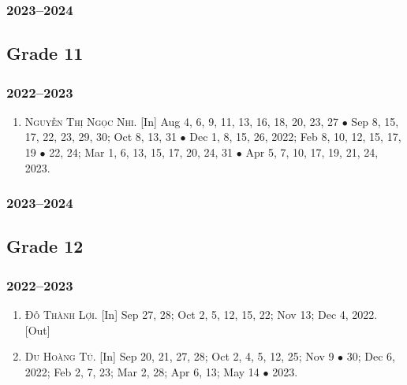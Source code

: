 \documentclass{article}
\begin{document}
\subsubsection{2023--2024}


\subsection{Grade 11}

\subsubsection{2022--2023}

\begin{enumerate}
	\item \textsc{Nguyễn Thị Ngọc Nhi.} \textsf{[In]} Aug 4, 6, 9, 11, 13, 16, 18, 20, 23, 27 $\bullet$ Sep 8, 15, 17, 22, 23, 29, 30; Oct 8, 13, 31 $\bullet$ Dec 1, 8,  15, 26, 2022; Feb 8, 10, 12, 15, 17, 19 $\bullet$ 22, 24; Mar 1, 6, 13, 15, 17, 20, 24, 31 $\bullet$ Apr 5, 7, 10, 17, 19, 21, 24, 2023.
\end{enumerate}

\subsubsection{2023--2024}


\subsection{Grade 12}

\subsubsection{2022--2023}

\begin{enumerate}
	\item \textsc{Đỗ Thành Lợi.} \textsf{[In]} Sep 27, 28; Oct 2, 5, 12, 15, 22; Nov 13; Dec 4, 2022. \textsf{[Out]}
	\item \textsc{Du Hoàng Tú.} \textsf{[In]} Sep 20, 21, 27, 28; Oct 2, 4, 5, 12, 25; Nov 9 $\bullet$ 30; Dec 6, 2022; Feb 2, 7, 23; Mar 2, 28; Apr 6, 13; May 14 $\bullet$ 2023.
\end{enumerate}
\end{document}
